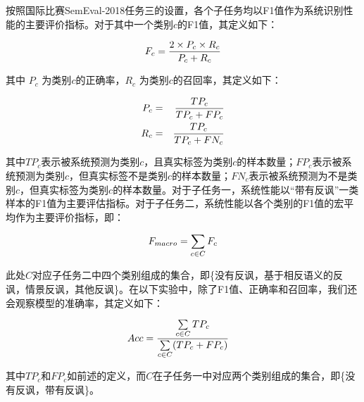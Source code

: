 按照国际比赛SemEval-2018任务三的设置，各个子任务均以F1值作为系统识别性能的主要评价指标。对于其中一个类别$c$的F1值，其定义如下：

\vspace{-8mm}
\begin{equation}
\vspace{-2mm}
  F_c = \frac{2 \times P_c \times R_c}{P_c + R_c} 
\end{equation}

其中 $P_c$ 为类别$c$的正确率，$R_c$ 为类别$c$的召回率，其定义如下：

\vspace{-8mm}
\begin{eqnarray}
\vspace{-2mm}
  P_c &=& \frac{TP_c}{TP_c + FP_c} \\
  R_c &=& \frac{TP_c}{TP_c + FN_c}
\end{eqnarray}

其中$TP_c$表示被系统预测为类别$c$，且真实标签为类别$c$的样本数量；$FP_c$表示被系统预测为类别$c$，但真实标签不是类别$c$的样本数量；$FN_c$表示被系统预测为不是类别$c$，但真实标签为类别$c$的样本数量。对于子任务一，系统性能以“带有反讽”一类样本的F1值为主要评估指标。对于子任务二，系统性能以各个类别的F1值的宏平均作为主要评价指标，即：

\vspace{-8mm}
\begin{equation}
\vspace{-2mm}
\begin{aligned}
  F_{macro} = \sum\limits_{c \in C}F_c
\end{aligned}
\end{equation}

此处$C$对应子任务二中四个类别组成的集合，即\{没有反讽，基于相反语义的反讽，情景反讽，其他反讽\}。在以下实验中，除了F1值、正确率和召回率，我们还会观察模型的准确率，其定义如下：

\vspace{-8mm}
\begin{equation}
\vspace{-2mm}
\begin{aligned}
  Acc &= \frac{\sum\limits_{c \in C} TP_c}{\sum\limits_{c \in C}(TP_c + FP_c)}
\end{aligned}
\end{equation}

其中$TP_c$和$FP_c$如前述的定义，而$C$在子任务一中对应两个类别组成的集合，即\{没有反讽，带有反讽\}。


